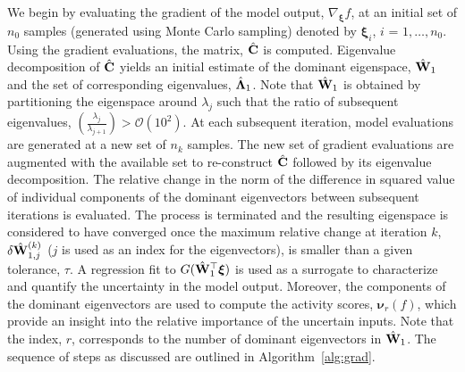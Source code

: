 We begin by evaluating the gradient of the model output, $\nabla_{\bm{\xi}}f$,
at an initial set of $n_0$ samples (generated using Monte Carlo sampling)
denoted by $\bm{\xi}_i$, $i$ = $1,\ldots,n_0$.
Using the gradient
evaluations, the matrix, $\hat{\mathbf{{C}}}$ is computed. Eigenvalue decomposition
of $\hat{\mathbf{{C}}}$ yields an initial estimate of the dominant eigenspace,
$\hat{\mathbf{{W}}}_1$ and the set of corresponding eigenvalues, 
$\hat{\mathbf{{\Lambda}}}_1$. Note that $\hat{\mathbf{{W}}}_1$ is obtained by
partitioning the eigenspace around $\lambda_j$ such that the ratio of
subsequent eigenvalues,
$\left(\frac{\lambda_j}{\lambda_{j+1}}\right)>\mathcal{O}(10^2)$.
 At each subsequent iteration, model evaluations are
generated at a new set of $n_k$ samples. The new set of gradient evaluations
are augmented with the available set to re-construct $\hat{\mathbf{{C}}}$ followed
by its eigenvalue decomposition. The relative change in the norm of the
difference in squared value of individual components of the dominant
eigenvectors between subsequent iterations is evaluated. The process is
terminated and the resulting eigenspace is considered to have converged once
the maximum relative change at iteration $k$, $\delta \hat{\mathbf{{W}}}_{1,j}^{(k)}$
($j$ is used as an index for the eigenvectors),
is smaller than a given tolerance, $\tau$.  A regression fit to
$G(\hat{\mathbf{{W}}}_1^\top\bm{\xi})$ is used as a surrogate to characterize and
quantify the uncertainty in the model output. Moreover, the components of the
dominant eigenvectors are used to compute the activity scores, $\bm{\nu}_r(f)$,
which provide an insight into the relative importance of the uncertain inputs.
Note that the index, $r$, corresponds to the number of dominant eigenvectors in
$\hat{\mathbf{{W}}}_1$. The sequence of steps as discussed are outlined
in Algorithm~\ref{alg:grad}.


